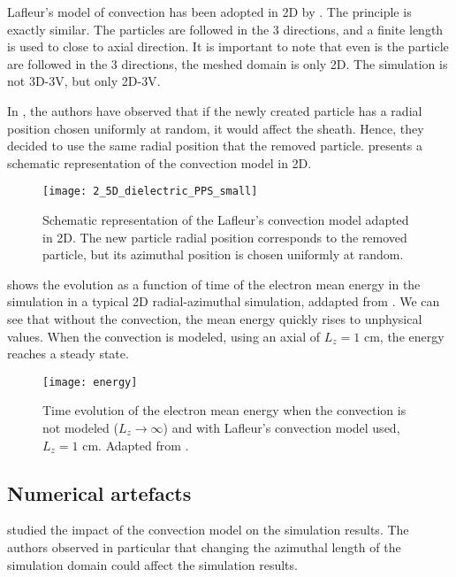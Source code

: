     Lafleur's model of convection has been adopted in \ac{2D} by \citet{croes2017a}.
    The principle is exactly similar.
    The particles are followed in the 3 directions, and a finite length is used to close to axial direction.
    It is important to note that even is the particle are followed in the 3 directions, the meshed domain is only \ac{2D}.
    The simulation is not \ac{3D}-\ac{3V}, but only \ac{2D}-\ac{3V}.

    In \citet{croes2017a}, the authors have observed that if the newly created particle has a radial position chosen uniformly at random, it would affect the sheath.
    Hence, they decided to use the same radial position that the removed particle.
     presents a schematic representation of the convection model in \ac{2D}.

    \begin{figure}[hbtp]
      \centering
      \texttt{[image: 2\_5D\_dielectric\_PPS\_small]}
      \caption{Schematic representation of the Lafleur's convection model adapted in \ac{2D}. The new particle radial position corresponds to the removed particle, but its azimuthal position is chosen uniformly at random. }
      \label{fig-Fake_2d}
    \end{figure}

     shows the evolution as a function of time of the electron mean energy in the simulation in a typical \ac{2D} radial-azimuthal simulation, addapted from \citet{croes2017}.
    We can see that without the convection, the mean energy quickly rises to unphysical values.
    When the convection is modeled, using an axial of $L_z=1$ cm, the energy reaches a steady state.
    \begin{figure}[hbtp]
      \centering
      \texttt{[image: energy]}
      \caption{Time evolution of the electron mean energy when the convection is not modeled ($L_z \rightarrow \infty$) and with Lafleur's convection model used, $L_z = 1$ cm. Adapted from \citet{croes2017}.}
      \label{fig-energy_convection}
    \end{figure}



  \subsection{Numerical artefacts}
    \citet{lafleur2016a} studied the impact of the convection model on the simulation results.
    The authors observed in particular that changing the azimuthal length of the simulation domain could affect the simulation results.

